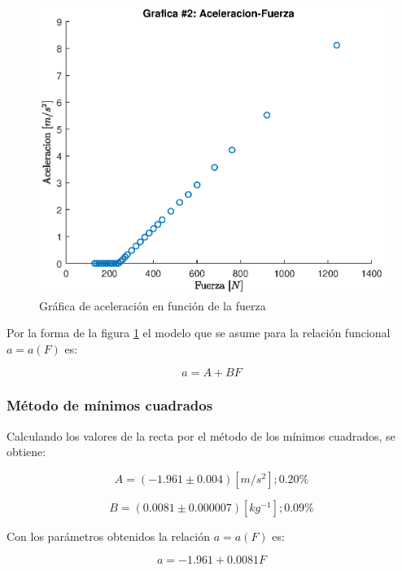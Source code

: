 \documentclass[letter,11pt]{article}
\begin{document}
\begin{figure}[!h]
\centering
\includegraphics[scale=1.00]{resources/7.2.1.eps}
\caption{Gráfica de aceleración en función de la fuerza}
\label{practica73}
\end{figure}

Por la forma de la figura \ref{practica73} el modelo que se asume para la
relación funcional $a = a(F)$ es:

\begin{equation*}
    a = A + B F
\end{equation*}

\subsubsection{Método de mínimos cuadrados}

Calculando los valores de la recta por el método de los mínimos cuadrados, se
obtiene:

\begin{equation*}
    A = (-1.961 \pm 0.004)[m/s^2];0.20\%
\end{equation*}

\begin{equation*}
    B = (0.0081 \pm 0.000007)[kg^{-1}];0.09\%
\end{equation*}

Con los parámetros obtenidos la relación $a = a(F)$ es:

\begin{equation}
    a = - 1.961 + 0.0081 F
\end{equation}
\end{document}
